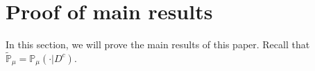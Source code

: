 \documentclass[12pt,oneside,english]{amsart}
\theoremstyle{plain}
\newtheorem{lem}[thm]{Lemma}
\theoremstyle{definition}
\numberwithin{equation}{section}
\begin{document}
\section{Proof of main results}

In this section, we will prove the main results of this paper. Recall that $\mathbb{\tilde{P}}_{\mu}=\mathbb{P}_{\mu}(\cdot|D^c)$.
\begin{comment}
\begin{lem}\label{lemma32}
    Write $\mathcal{A}_t(\epsilon)=\{\|X_t\|\in\|\mu\|(e^{(\alpha-\epsilon)t},e^{(\alpha+\epsilon)t})\},$ for each $\epsilon,t>0$.
    Then for any $\epsilon>0$, we have
\begin{align}
    \lim_{t\rightarrow\infty}\mathcal{A}_t(\epsilon)=D^c, ~~\mathbb{P}_{\mu}\text{-}{\rm a.s}.
\end{align}
\end{lem}
\begin{proof}
    We just need to prove
    \begin{align}
        D^c \subset \liminf_{t\rightarrow\infty}\mathcal{A}_t(\epsilon)\subset \limsup_{t\rightarrow\infty}\mathcal{A}_t(\epsilon)\subset D^c,~~\mathbb{P}_{\mu}\text{-}{\rm a.s}.
    \end{align}

    On one hand, let $\omega\in D$. Then there exists $T(\omega)>0$, such that $\|X_t(\omega)\|=0,$ for each $t\geq T(\omega)$.
    Thus $\omega\notin  \limsup_{t\rightarrow\infty}\mathcal{A}_t(\epsilon)=\cap_{s\geq 0}\cup_{t\geq s}\mathcal{A}_t(\epsilon)$.
    This implies that $\limsup_{t\rightarrow\infty}\mathcal{A}_t(\epsilon)\subset D^c$.


    On the other hand, let $\omega \in \{H_{\infty}>0\}\cap\{\lim_{t\rightarrow \infty} H_t=H_{\infty}\}$.
    Then, there exists $\delta>0$ such that $H_{\infty}(\omega)\in(\delta,\frac{1}{\delta})$ and there exists $S_1>0$ such that for any $t\geq S_1$, we have $\frac{\delta}{2}\leq H_t(\omega)\leq 2\delta$.
    Taking $S_2>0$ such that for any $t>S_2$, $\|\mu\|e^{-\epsilon t}<\frac{\delta}{2}$ and $\|\mu\|e^{\epsilon t}>2\delta$.
    Then $\omega\in \mathcal{A}_t(\epsilon),$ for each $t>S:=\max\{S_1,S_2\}$.
    This implies that $\omega \in \liminf_{t\rightarrow \infty}\mathcal{A}_t(\epsilon):=\cup_{s>0}\cap_{t\geq s}\mathcal{A}_t(\epsilon)$.
    According to \cite{LSR}, $D^c=\{H_{\infty}>0\}\cap\{\lim_{t\rightarrow \infty} H_t=H_{\infty}\}, \mathbb{P}_{\mu}$-a.s.. Using this we get the desired result.
\end{proof}
\end{comment}
\end{document}
